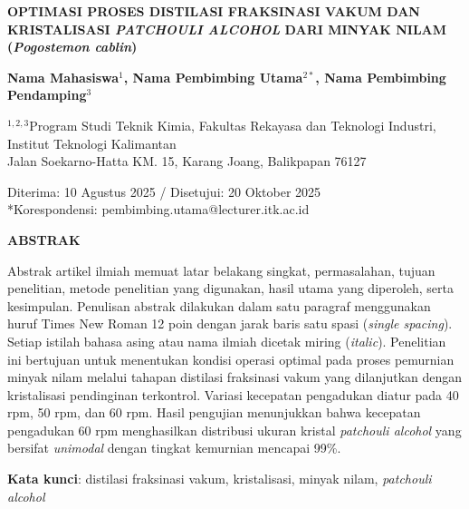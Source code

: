 \documentclass[a4paper,12pt,twoside]{article}
\begin{document}
\begin{center}
  \singlespacing
  {\fontsize{14pt}{18pt}\selectfont\bfseries
  OPTIMASI PROSES DISTILASI FRAKSINASI VAKUM DAN KRISTALISASI \textit{PATCHOULI ALCOHOL} DARI MINYAK NILAM (\textit{Pogostemon cablin})\par}
  \vspace{12pt}

  {\fontsize{12pt}{14pt}\selectfont\bfseries
  Nama Mahasiswa$^1$, Nama Pembimbing Utama$^{2*}$, Nama Pembimbing Pendamping$^3$\par}
  \vspace{12pt}

  {\fontsize{10pt}{13pt}\selectfont
  $^{1,2,3}$Program Studi Teknik Kimia, Fakultas Rekayasa dan Teknologi Industri, Institut Teknologi Kalimantan\\
  Jalan Soekarno-Hatta KM. 15, Karang Joang, Balikpapan 76127\par}
  \vspace{12pt}

  {\fontsize{10pt}{13pt}\selectfont
  Diterima: 10 Agustus 2025 / Disetujui: 20 Oktober 2025\\
  *Korespondensi: pembimbing.utama@lecturer.itk.ac.id\par}
\end{center}
\vspace{10pt}

\noindent\textbf{ABSTRAK}\par
\vspace{4pt}
\begingroup
\singlespacing\noindent
Abstrak artikel ilmiah memuat latar belakang singkat, permasalahan, tujuan penelitian, metode penelitian yang digunakan, hasil utama yang diperoleh, serta kesimpulan. Penulisan abstrak dilakukan dalam satu paragraf menggunakan huruf Times New Roman 12 poin dengan jarak baris satu spasi (\textit{single spacing}). Setiap istilah bahasa asing atau nama ilmiah dicetak miring (\textit{italic}). Penelitian ini bertujuan untuk menentukan kondisi operasi optimal pada proses pemurnian minyak nilam melalui tahapan distilasi fraksinasi vakum yang dilanjutkan dengan kristalisasi pendinginan terkontrol. Variasi kecepatan pengadukan diatur pada 40 rpm, 50 rpm, dan 60 rpm. Hasil pengujian menunjukkan bahwa kecepatan pengadukan 60 rpm menghasilkan distribusi ukuran kristal \textit{patchouli alcohol} yang bersifat \textit{unimodal} dengan tingkat kemurnian mencapai 99\%.\par
\vspace{6pt}
\noindent\textbf{Kata kunci}: distilasi fraksinasi vakum, kristalisasi, minyak nilam, \textit{patchouli alcohol}
\endgroup
\vspace{14pt}
\end{document}
